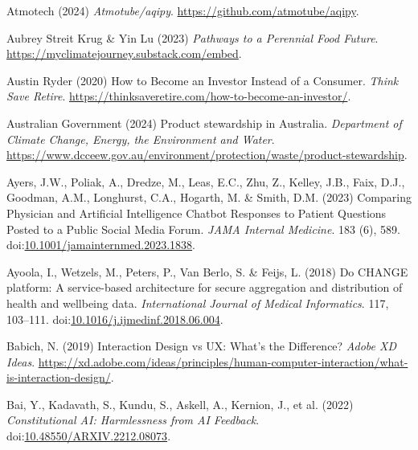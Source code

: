 \documentclass[
  letterpaper,
  DIV=11,
  numbers=noendperiod]{scrartcl}
\newlength{\cslhangindent}
\newenvironment{CSLReferences}[2] %
 {\begin{list}{}{%
  \setlength{\itemindent}{0pt}
  \setlength{\leftmargin}{0pt}
  \setlength{\parsep}{0pt}
  \ifodd #1
   \setlength{\leftmargin}{\cslhangindent}
   \setlength{\itemindent}{-1\cslhangindent}
  \fi
  \setlength{\itemsep}{#2\baselineskip}}}
 {\end{list}}
\begin{document}
\begin{CSLReferences}{0}{1}
Atmotech (2024) \emph{Atmotube/aqipy}.
\url{https://github.com/atmotube/aqipy}.

Aubrey Streit Krug \& Yin Lu (2023) \emph{Pathways to a {Perennial Food
Future}}. \url{https://myclimatejourney.substack.com/embed}.

Austin Ryder (2020) How to {Become} an {Investor Instead} of a
{Consumer}. \emph{Think Save Retire}.
\url{https://thinksaveretire.com/how-to-become-an-investor/}.

Australian Government (2024) Product stewardship in {Australia}.
\emph{Department of Climate Change, Energy, the Environment and Water}.
\url{https://www.dcceew.gov.au/environment/protection/waste/product-stewardship}.

Ayers, J.W., Poliak, A., Dredze, M., Leas, E.C., Zhu, Z., Kelley, J.B.,
Faix, D.J., Goodman, A.M., Longhurst, C.A., Hogarth, M. \& Smith, D.M.
(2023) Comparing {Physician} and {Artificial Intelligence Chatbot
Responses} to {Patient Questions Posted} to a {Public Social Media
Forum}. \emph{JAMA Internal Medicine}. 183 (6), 589.
doi:\href{https://doi.org/10.1001/jamainternmed.2023.1838}{10.1001/jamainternmed.2023.1838}.

Ayoola, I., Wetzels, M., Peters, P., Van Berlo, S. \& Feijs, L. (2018)
Do {CHANGE} platform: {A} service-based architecture for secure
aggregation and distribution of health and wellbeing data.
\emph{International Journal of Medical Informatics}. 117, 103--111.
doi:\href{https://doi.org/10.1016/j.ijmedinf.2018.06.004}{10.1016/j.ijmedinf.2018.06.004}.

Babich, N. (2019) Interaction {Design} vs {UX}: {What}'s the
{Difference}? \emph{Adobe XD Ideas}.
\url{https://xd.adobe.com/ideas/principles/human-computer-interaction/what-is-interaction-design/}.

Bai, Y., Kadavath, S., Kundu, S., Askell, A., Kernion, J., et al. (2022)
\emph{Constitutional {AI}: {Harmlessness} from {AI Feedback}}.
doi:\href{https://doi.org/10.48550/ARXIV.2212.08073}{10.48550/ARXIV.2212.08073}.


\end{CSLReferences}
\end{document}
